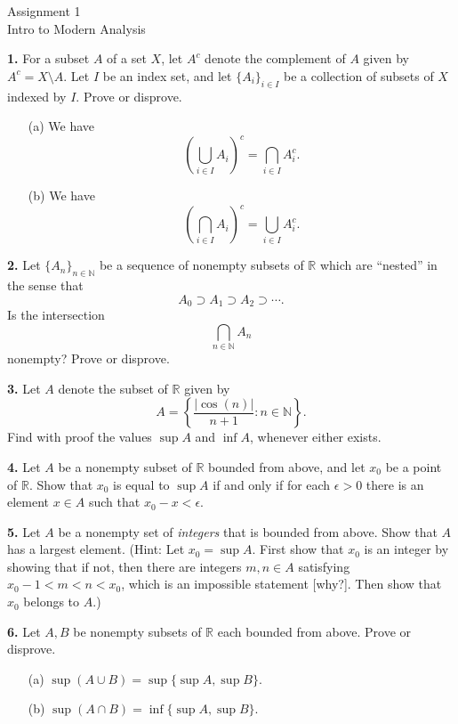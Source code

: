 \documentclass[12pt]{article}
\begin{document}
\begin{center}
Assignment 1\\
Intro to Modern Analysis
\end{center}

\noindent \textbf{1.} For a subset $A$ of a set $X$, let $A^c$ denote the complement of $A$ given by $A^c = X \setminus A$. Let $I$ be an index set, and let $\{A_i\}_{i \in I}$ be a collection of subsets of $X$ indexed by $I$. Prove or disprove.  
\begin{enumerate}
\item[(a)] We have 
\[
\left(\bigcup_{i \in I}A_i\right)^c = \bigcap_{i \in I}A_i^c.
\]
\item[(b)] We have 
\[
\left(\bigcap_{i \in I}A_i\right)^c = \bigcup_{i \in I}A_i^c.
\]
\end{enumerate}

\medskip

\noindent \textbf{2.} Let $\{A_n\}_{n \in \mathbb{N}}$ be a sequence of nonempty subsets of $\mathbb{R}$ which are ``nested'' in the sense that 
\[
A_0 \supset A_1 \supset A_2 \supset \cdots.
\]
Is the intersection 
\[
\bigcap_{n \in\mathbb{N}} A_n
\]
nonempty? Prove or disprove. 

\medskip

\noindent \textbf{3.} Let $A$ denote the subset of $\mathbb{R}$ given by  
\[
A = \left\{\frac{|\cos(n)|}{n+1} : n \in \mathbb{N} \right\}.
\]
Find with proof the values $\sup A$ and $\inf A$, whenever either exists. 

\medskip


\noindent \textbf{4.} Let $A$ be a nonempty subset of $\mathbb{R}$ bounded from above, and let $x_0$ be a point of $\mathbb{R}$.  Show that $x_0$ is equal to $\sup A$ if and only if for each $\epsilon > 0$ there is an element $x \in A$ such that $x_0 - x < \epsilon$. 

\medskip 

\noindent \textbf{5.} Let $A$ be a nonempty set of \emph{integers} that is bounded from above. Show that $A$ has a largest element. (Hint: Let $x_0 = \sup A$. First show that $x_0$ is an integer by showing that if not, then there are integers $m,n \in A$ satisfying $x_0 - 1 < m < n < x_0$, which is an impossible statement [why?]. Then show that $x_0$ belongs to $A$.)


\medskip




\noindent \textbf{6.} Let $A, B$ be nonempty subsets of $\mathbb{R}$ each bounded from above. Prove or disprove. 
\begin{enumerate}
\item[(a)] $\sup (A \cup B) = \sup\{ \sup A, \sup B \}$.
\item[(b)] $\sup(A \cap B) = \inf\{ \sup A, \sup B \}$. 
\end{enumerate}
\end{document}
